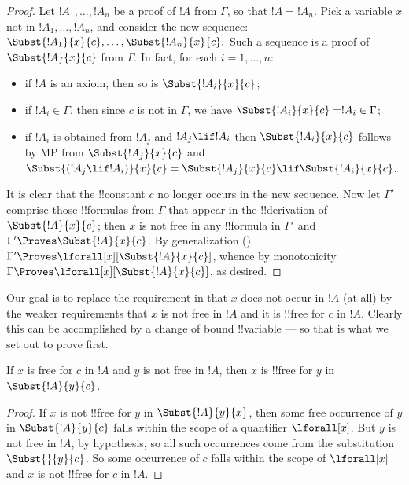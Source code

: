 \documentclass[../../../include/open-logic-section]{subfiles}
\begin{document}
\begin{proof} Let $!A_1,\ldots,!A_n$ be a proof of $!A$ from $\Gamma$, so
that $!A=!A_n$. Pick a variable $x$ not in $!A_1,\ldots,!A_n$, and consider
the new sequence: $\Subst{!A_1}{x}{c},\ldots,\Subst{!A_n}{x}{c}.$ Such a
sequence is a proof of $\Subst{!A}{x}{c}$ from $\Gamma$. In fact, for each
$i=1,\ldots,n$: \begin{itemize} \item if $!A$ is an axiom, then so is
$\Subst{!A_i}{x}{c}$; \item if $!A_i \in \Gamma$, then since $c$ is not in
$\Gamma$, we have $\Subst{!A_i}{x}{c} = !A_i \in \Gamma$; \item if $!A_i$
is obtained from $!A_j$ and $!A_j \lif !A_i$ then $\Subst{!A_i}{x}{c}$
follows by MP from $\Subst{!A_j}{x}{c}$ and $\Subst{(!A_j \lif !A_i)}{x}{c}
= \Subst{!A_j}{x}{c} \lif \Subst{!A_i}{x}{c}$. \end{itemize} It is clear
that the !!{constant} $c$ no longer occurs in the new sequence. Now let
$\Gamma'$ comprise those !!{formula}s from $\Gamma$ that appear in the
!!{derivation} of $\Subst{!A}{x}{c}$; then $x$ is not free in any
!!{formula} in $\Gamma'$ and $\Gamma' \Proves \Subst{!A}{x}{c}$. By
generalization () $\Gamma'
\Proves \lforall[x][\Subst{!A}{x}{c}]$, whence by monotonicity $\Gamma \Proves
\lforall[x][\Subst{!A}{x}{c}]$, as desired. 
\end{proof}

\begin{explain}
Our goal is to replace the requirement in  that $x$
does not occur in $!A$ (at all) by the weaker requirements that $x$ is
not free in $!A$ and it is !!{free for} $c$ in $!A$. Clearly this can
be accomplished by a change of bound !!{variable} --- so that is what
we set out to prove first.
\end{explain}

\begin{lem}
If $x$ is free for $c$ in $!A$ and $y$ is not free in $!A$, then $x$
is !!{free for} $y$ in $\Subst{!A}{y}{c}$.
\end{lem}

\begin{proof} If $x$ is not !!{free for} $y$ in $\Subst{!A}{y}{x}$, then
some free occurrence of $y$ in $\Subst{!A}{y}{c}$ falls within the scope of
a quantifier $\lforall[x]$. But $y$ is not free in $!A$, by hypothesis, so
all such occurrences come from the substitution $\Subst{}{y}{c}$. So some
occurrence of $c$ falls within the scope of $\lforall[x]$ and $x$ is not
!!{free for} $c$ in $!A$. 
\end{proof}
\end{document}
